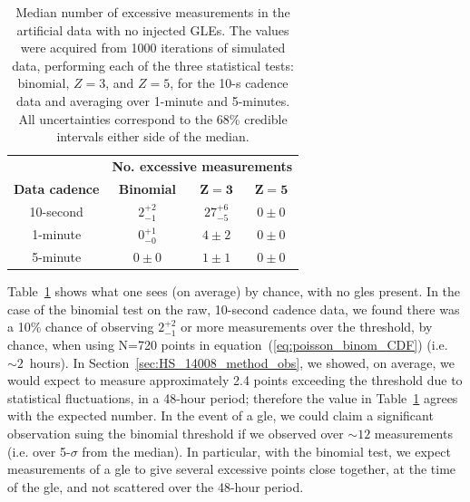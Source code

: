 \begin{table}[ht!]
	\begin{center}
		\caption{Median number of excessive measurements in the artificial data with no injected GLEs. The values were acquired from 1000 iterations of simulated data, performing each of the three statistical tests: binomial, $Z=3$, and $Z=5$, for the 10-s cadence data and averaging over 1-minute and 5-minutes. All uncertainties correspond to the 68\% credible intervals either side of the median.}
		\label{tab:HS_14008_sims_zeros}
		\begin{tabular}{c c c c}
			\hline 
			{} & \multicolumn{3}{c}{\bf No. excessive measurements} \\ 
			{\bf Data cadence} & {\bf Binomial} & {\bf $\mathbf{Z=3}$} & {\bf $\mathbf{Z=5}$}  \\ 
			\hline 
			10-second & $2^{+2}_{-1}$ & $27^{+6}_{-5}$ & $0 \pm 0$ \\ 
			1-minute & $0^{+1}_{-0}$ & $4 \pm 2$ & $0 \pm 0$ \\ 
			5-minute & $0 \pm 0$ & $1 \pm 1$ & $0 \pm 0$ \\ 
			\hline 
		\end{tabular} 
	\end{center}
\end{table}
%
%
\vspace{1em}

Table~\ref{tab:HS_14008_sims_zeros} shows what one sees (on average) by chance, with no \glspl{gle} present. In the case of the binomial test on the raw, 10-second cadence data, we found there was a 10\% chance of observing $2^{+2}_{-1}$ or more measurements over the threshold, by chance, when using N=720 points in equation~(\ref{eq:poisson_binom_CDF}) (i.e. $\sim2$~hours). In Section~\ref{sec:HS_14008_method_obs}, we showed, on average, we would expect to measure approximately 2.4 points exceeding the threshold due to statistical fluctuations, in a 48-hour period; therefore the value in Table~\ref{tab:HS_14008_sims_zeros} agrees with the expected number. In the event of a \gls{gle}, we could claim a significant observation suing the binomial threshold if we observed over $\sim12$ measurements (i.e. over 5-$\sigma$ from the median). In particular, with the binomial test, we expect measurements of a \gls{gle} to give several excessive points close together, at the time of the \gls{gle}, and not scattered over the 48-hour period. %

